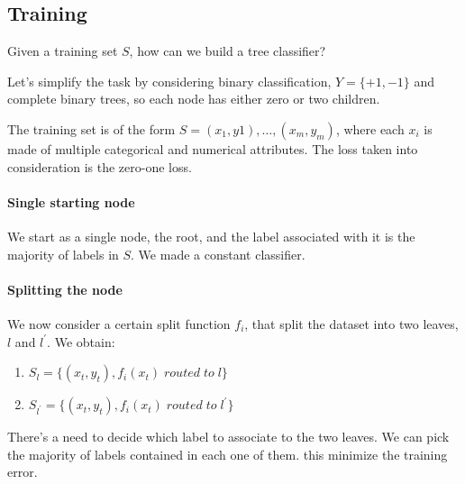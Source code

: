 \subsection{Training}
Given a training set $S$, how can we build a tree classifier?

Let's simplify the task by considering binary classification, 
$Y = \{+1, -1\}$ 
and complete binary trees, so each node has either zero or 
two children.

The training set is of the form $S = (x_1,y1), \dots , (x_m, y_m)$, 
where each $x_i$ is made of multiple categorical and numerical attributes.
The loss taken into consideration is the zero-one loss.

\paragraph{Single starting node}
We start as a single node, the root, and the label associated with it is the 
majority of labels in $S$. We made a constant classifier.

\paragraph{Splitting the node}
We now consider a certain split function $f_i$, that split the dataset into 
two leaves, $l$ and $l^\prime$. We obtain:
\begin{enumerate}
    \item $S_l = \{(x_t, y_t), f_i(x_t) \mathit{\;routed\;to\;} l\}$
    \item $S_{l^\prime} = \{(x_t, y_t), f_i(x_t) \mathit{\;routed\;to\;} l^\prime\}$
\end{enumerate}
There's a need to decide which label to associate to the two leaves. We can 
pick the majority of labels contained in each one of them. 
this minimize the training error.

